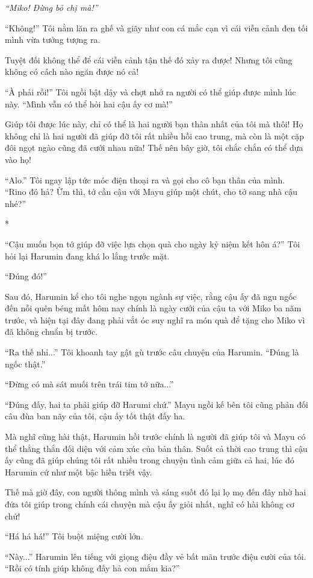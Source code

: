 {\emph{``Miko! Đừng bỏ chị mà!''}

``Không!'' Tôi nằm lăn ra ghế và giãy như con cá mắc cạn vì cái viễn
cảnh đen tối mình vừa tưởng tượng ra.

Tuyệt đối không thể để cái viễn cảnh tận thế đó xảy ra được! Nhưng tôi
cũng không có cách nào ngăn được nó cả!

``À phải rồi!'' Tôi ngồi bật dậy và chợt nhớ ra người có thể giúp được
mình lúc này. ``Mình vẫn có thể hỏi hai cậu ấy cơ mà!''

Giúp tôi được lúc này, chỉ có thể là hai người bạn thân nhất của tôi mà
thôi! Họ không chỉ là hai người đã giúp đỡ tôi rất nhiều hồi cao trung,
mà còn là một cặp đôi ngọt ngào cũng đã cưới nhau nữa! Thế nên bây giờ,
tôi chắc chắn có thể dựa vào họ!

``Alo.'' Tôi ngay lập tức móc điện thoại ra và gọi cho cô bạn thân của
mình. ``Rino đó hả? Ừm thì, tớ cần cậu với Mayu giúp một chút, cho tớ
sang nhà cậu nhé?''

*

``Cậu muốn bọn tớ giúp đỡ việc lựa chọn quà cho ngày kỷ niệm kết hôn
á?'' Tôi hỏi lại Harumin đang khá lo lắng trước mặt.

``Đúng đó!''

Sau đó, Harumin kể cho tôi nghe ngọn ngành sự việc, rằng cậu ấy đã ngu
ngốc đến nỗi quên béng mất hôm nay chính là ngày cưới của cậu ta với
Miko ba năm trước, và hiện tại đây đang phải vắt óc suy nghĩ ra món quà
để tặng cho Miko vì đã không chuẩn bị trước.

``Ra thế nhỉ...'' Tôi khoanh tay gật gù trước câu chuyện của Harumin.
``Đúng là ngốc thật.''

``Đừng có mà sát muối trên trái tim tớ nữa...''

``Đúng đấy, hai ta phải giúp đỡ Harumi chứ.'' Mayu ngồi kế bên tôi cũng
phản đối câu đùa ban nãy của tôi, cậu ấy tốt thật đấy ha.

Mà nghĩ cũng hài thật, Harumin hồi trước chính là người đã giúp tôi và
Mayu có thể thẳng thắn đối diện với cảm xúc của bản thân. Suốt cả thời
cao trung thì cậu ấy cũng đã giúp chúng tôi rất nhiều trong chuyện tình
cảm giữa cả hai, lúc đó Harumin cứ như một bậc hiền triết vậy.

Thế mà giờ đây, con người thông mình và sáng suốt đó lại lọ mọ đến đây
nhờ hai đứa tôi giúp trong chính cái chuyện mà cậu ấy giỏi nhất, nghĩ có
hài không cơ chứ!

``Há há há!'' Tôi buột miệng cười lớn.

``Này...'' Harumin lên tiếng với giọng điệu đầy vẻ bất mãn trước điệu
cười của tôi. ``Rồi có tính giúp không đấy hả con mắm kia?''

}

